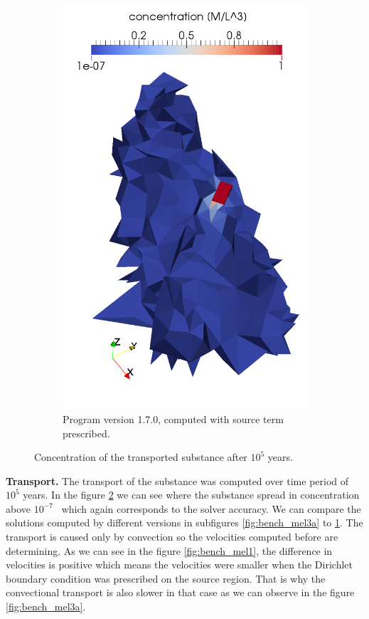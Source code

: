 \begin{figure}[!h]
\begin{subfigure}[b]{0.3\textwidth}
        \includegraphics[width=\textwidth]{tests_graphics/transport_end_170.pdf}
        \caption{Program version 1.7.0, computed with source term prescribed.}
        \label{fig:bench_mel3c}
    \end{subfigure}
    \caption{Concentration of the transported substance after $10^5$ years.}
    \label{fig:bench_mel3}
\end{figure}

\textbf{Transport.}
The transport of the substance was computed over time period of $10^5$ years. In the figure \ref{fig:bench_mel3} we can see 
where the substance spread in concentration above $10^{-7}$~ which again corresponds to the solver accuracy.
We can compare the solutions computed by different versions in subfigures \ref{fig:bench_mel3a} to \ref{fig:bench_mel3c}.
The transport is caused only by convection so the velocities computed before are determining. As we can see in the figure 
\ref{fig:bench_mel1}, the difference in velocities is positive which means the velocities were smaller when the Dirichlet 
boundary condition was prescribed on the source region. That is why the convectional transport is also slower in that case 
as we can observe in the figure \ref{fig:bench_mel3a}. 

